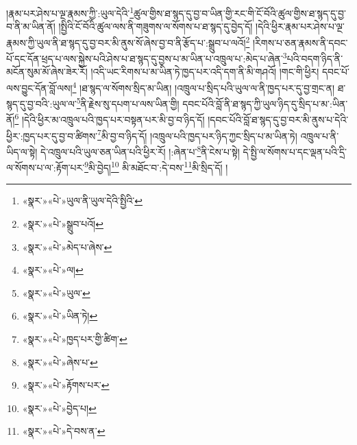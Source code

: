 །རྣམ་པར་ཤེས་པ་ལྔ་རྣམས་ཀྱི་:ཡུལ་དེའི་\footnote{«སྣར་»«པེ་»ཡུལ་ནི་ཡུལ་དེའི་སྤྱིའི་}ཚུལ་གྱིས་ཐ་སྙད་དུ་བྱ་བ་ཡིན་གྱི་རང་གི་ངོ་བོའི་ཚུལ་གྱིས་ཐ་སྙད་དུ་བྱ་བ་ནི་མ་ཡིན་ནོ། །སྤྱིའི་ངོ་བོའི་ཚུལ་ལས་ནི་གཟུགས་ལ་སོགས་པ་ཐ་སྙད་དུ་བྱེད་དོ། །དེའི་ཕྱིར་རྣམ་པར་ཤེས་པ་ལྔ་རྣམས་ཀྱི་ཡུལ་ནི་ཐ་སྙད་དུ་བྱ་བར་མི་ནུས་སོ་ཞེས་བྱ་བ་ནི་རྩོད་པ་:སྒྲུབ་པ་ལའོ།\footnote{«སྣར་»«པེ་»སྒྲུབ་པའོ།} །རིགས་པ་ཅན་རྣམས་ནི་དབང་པོ་དང་དོན་ཕྲད་པ་ལས་སྐྱེས་པའི་ཤེས་པ་ཐ་སྙད་དུ་བྱས་པ་མ་ཡིན་པ་འཁྲུལ་པ་:མེད་པ་ཞེན་\footnote{«སྣར་»«པེ་»མེད་པ་ཞེས་}པའི་བདག་ཉིད་ནི་མངོན་སུམ་མོ་ཞེས་ཟེར་རོ། །འདི་ཡང་རིགས་པ་མ་ཡིན་ཏེ་ཁྱད་པར་འདི་དག་ནི་མི་གཤའོ། །གང་གི་ཕྱིར། དབང་པོ་ལས་བྱུང་དོན་བློ་ལས།\footnote{«སྣར་»«པེ་»ལ།} །ཐ་སྙད་ལ་སོགས་སྲིད་མ་ཡིན། །འཁྲུལ་པ་སྲིད་པའི་ཡུལ་ལ་ནི་ཁྱད་པར་དུ་བྱ་གྲང་ན། ཐ་སྙད་དུ་བྱ་བའི་:ཡུལ་ལ་\footnote{«སྣར་»«པེ་»ཡུལ་}ནི་རྗེས་སུ་དཔག་པ་ལས་ཡིན་གྱི། དབང་པོའི་བློ་ནི་ཐ་སྙད་ཀྱི་ཡུལ་ཉིད་དུ་སྲིད་པ་མ་:ཡིན་ནོ།\footnote{«སྣར་»«པེ་»ཡིན་ཏེ།} །དེའི་ཕྱིར་མ་འཁྲུལ་པའི་ཁྱད་པར་བསྟན་པར་མི་བྱ་བ་ཉིད་དོ། །དབང་པོའི་བློ་ཐ་སྙད་དུ་བྱ་བར་མི་ནུས་པ་དེའི་ཕྱིར་:ཁྱད་པར་དུ་བྱ་བ་ཚིགས་\footnote{«སྣར་»«པེ་»ཁྱད་པར་གྱི་ཚིག་}མི་བྱ་བ་ཉིད་དོ། །འཁྲུལ་པའི་ཁྱད་པར་ཉིད་ཀྱང་སྲིད་པ་མ་ཡིན་ཏེ། འཁྲུལ་པ་ནི་ཡིད་ལ་སྟེ། དེ་འཁྲུལ་པའི་ཡུལ་ཅན་ཡིན་པའི་ཕྱིར་རོ། །:ཞེན་པ་\footnote{«སྣར་»«པེ་»ཞེས་པ་}ནི་ངེས་པ་སྟེ། དེ་སྤྱི་ལ་སོགས་པ་དང་ལྡན་པའི་དྲི་ལ་སོགས་པ་ལ་:རྟོག་པར་\footnote{«སྣར་»«པེ་»རྟོགས་པར་}མི་བྱེད།\footnote{«སྣར་»«པེ་»བྱེད་པ།} མི་མཐོང་བ་:དེ་བས་\footnote{«སྣར་»«པེ་»དེ་བས་ན་}མི་སྲིད་དོ། །

